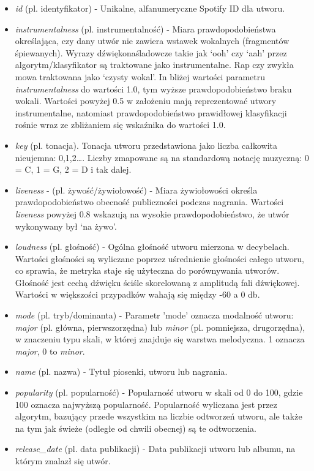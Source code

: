\documentclass[a4paper,11pt]{article}
\begin{document}
\begin{itemize}
        \item \textit{id} (pl. identyfikator) - Unikalne, alfanumeryczne Spotify ID dla utworu.
        \item \textit{instrumentalness} (pl. instrumentalność) - Miara prawdopodobieństwa określająca, czy dany utwór nie zawiera wstawek wokalnych (fragmentów śpiewanych). Wyrazy dźwiękonaśladowcze takie jak `ooh' czy `aah' przez algorytm/klasyfikator są traktowane jako instrumentalne. Rap czy zwykła mowa traktowana jako `czysty wokal'. In bliżej wartości parametru \textit{instrumentalness} do wartości 1.0, tym wyższe prawdopodobieństwo braku wokali. Wartości powyżej 0.5 w założeniu mają reprezentować utwory instrumentalne, natomiast prawdopodobieństwo prawidłowej klasyfikacji rośnie wraz ze zbliżaniem się wskaźnika do wartości 1.0.
        \item \textit{key} (pl. tonacja). Tonacja utworu przedstawiona jako liczba całkowita nieujemna: 0,1,2\ldots . Liczby zmapowane są na standardową notację muzyczną: 0 = C, 1 = G, 2 = D i tak dalej.
        \item \textit{liveness} - (pl. żywość/żywiołowość) - Miara żywiołowości określa prawdopodobieństwo obecność publiczności podczas nagrania. Wartości \textit{liveness} powyżej 0.8 wskazują na wysokie prawdopodobieństwo, że utwór wykonywany był `na żywo'.
        \item \textit{loudness} (pl. głośność) - Ogólna głośność utworu mierzona w decybelach. Wartości głośności są wyliczane poprzez uśrednienie głośności całego utworu, co sprawia, że metryka staje się użyteczna do porównywania utworów. Głośność jest cechą dźwięku ściśle skorelowaną z amplitudą fali dźwiękowej. Wartości w większości przypadków wahają się między -60 a 0 db.
        \item \textit{mode} (pl. tryb/dominanta) - Parametr 'mode' oznacza modalność utworu: \textit{major} (pl. główna, pierwszorzędna) lub \textit{minor} (pl. pomniejsza, drugorzędna), w znaczeniu typu skali, w której znajduje się warstwa melodyczna. 1 oznacza \textit{major}, 0 to \textit{minor}.
        \item \textit{name} (pl. nazwa) - Tytuł piosenki, utworu lub nagrania.
        \item \textit{popularity} (pl. popularność) - Popularność utworu w skali od 0 do 100, gdzie 100 oznacza najwyższą popularność. Popularność wyliczana jest przez algorytm, bazujący przede wszystkim na liczbie odtworzeń utworu, ale także na tym jak świeże (odległe od chwili obecnej) są te odtworzenia.
        \item \textit{release\_date} (pl. data publikacji) - Data publikacji utworu lub albumu, na którym znalazł się utwór.

\end{itemize}
\end{document}
